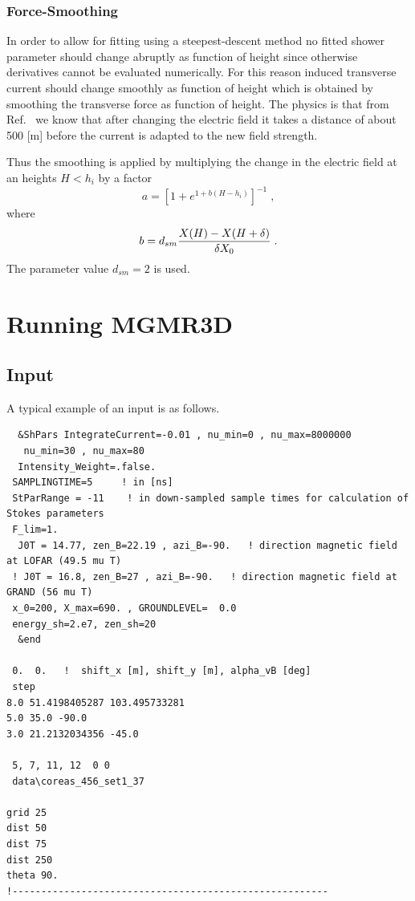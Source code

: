 \documentclass[pdftex,dvipsnames,usenames,fleqn,12pt]{article}
\def\beq{\begin{equation}}
\def\eeq{\end{equation} }
\def\eqlab#1{\label{eq:#1}}
\begin{document}
\subsubsection{Force-Smoothing}

In order to allow for fitting using a steepest-descent method no fitted shower parameter should change abruptly as function of height since otherwise derivatives cannot be evaluated numerically. For this reason induced transverse current should change smoothly as function of height which is obtained by smoothing the transverse force as function of height. The physics is that from Ref.~\cite{Tri15} we know that after changing the electric field it takes a distance of about 500 [m] before the current is adapted to the new field strength.

Thus the smoothing is applied by multiplying the change in the electric field at an heights $H<h_i$ by a factor
\beq
a=\left[1 + e^{1 + b (H-h_i)}\right]^{-1} \;, \eqlab{Smooth}
\eeq
where
\beq
b=d_{sm} {X(H)-X(H+\delta)\over \delta X_0} \;. \eqlab{D-SM}
\eeq
The parameter value $d_{sm}=2$ is used.

\section{Running MGMR3D}

\subsection{Input}

A typical example of an input is as follows.

\begin{linenumbers}
\begin{verbatim}
  &ShPars IntegrateCurrent=-0.01 , nu_min=0 , nu_max=8000000
   nu_min=30 , nu_max=80
  Intensity_Weight=.false.
 SAMPLINGTIME=5     ! in [ns]
 StParRange = -11    ! in down-sampled sample times for calculation of Stokes parameters
 F_lim=1.
  J0T = 14.77, zen_B=22.19 , azi_B=-90.   ! direction magnetic field at LOFAR (49.5 mu T)
 ! J0T = 16.8, zen_B=27 , azi_B=-90.   ! direction magnetic field at GRAND (56 mu T)
 x_0=200, X_max=690. , GROUNDLEVEL=  0.0
 energy_sh=2.e7, zen_sh=20
  &end

 0.  0.   !  shift_x [m], shift_y [m], alpha_vB [deg]
 step
8.0 51.4198405287 103.495733281
5.0 35.0 -90.0
3.0 21.2132034356 -45.0

 5, 7, 11, 12  0 0
 data\coreas_456_set1_37

grid 25
dist 50
dist 75
dist 250
theta 90.
!-------------------------------------------------------
\end{verbatim}
\end{linenumbers}
\end{document}
